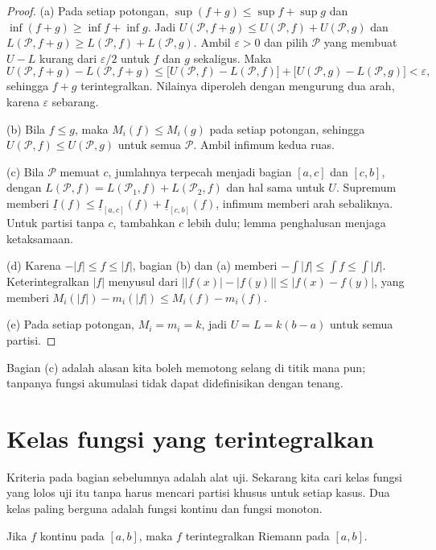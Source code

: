 \begin{proof}
(a) Pada setiap potongan, $\sup(f+g)\le\sup f+\sup g$ dan $\inf(f+g)\ge\inf f+\inf g$.
Jadi $U(\mathcal{P},f+g)\le U(\mathcal{P},f)+U(\mathcal{P},g)$ dan
$L(\mathcal{P},f+g)\ge L(\mathcal{P},f)+L(\mathcal{P},g)$. Ambil $\varepsilon>0$ dan
pilih $\mathcal{P}$ yang membuat $U-L$ kurang dari $\varepsilon/2$ untuk $f$ dan $g$
sekaligus. Maka
\[
U(\mathcal{P},f+g)-L(\mathcal{P},f+g)
\le\bigl[U(\mathcal{P},f)-L(\mathcal{P},f)\bigr]
+\bigl[U(\mathcal{P},g)-L(\mathcal{P},g)\bigr]<\varepsilon ,
\]
sehingga $f+g$ terintegralkan. Nilainya diperoleh dengan mengurung dua arah, karena
$\varepsilon$ sebarang.

(b) Bila $f\le g$, maka $M_i(f)\le M_i(g)$ pada setiap potongan, sehingga
$U(\mathcal{P},f)\le U(\mathcal{P},g)$ untuk semua $\mathcal{P}$. Ambil infimum kedua
ruas.

(c) Bila $\mathcal{P}$ memuat $c$, jumlahnya terpecah menjadi bagian $[a,c]$ dan
$[c,b]$, dengan $L(\mathcal{P},f)=L(\mathcal{P}_1,f)+L(\mathcal{P}_2,f)$ dan hal sama
untuk $U$. Supremum memberi
$\underline{I}(f)\le\underline{I}_{[a,c]}(f)+\underline{I}_{[c,b]}(f)$, infimum
memberi arah sebaliknya. Untuk partisi tanpa $c$, tambahkan $c$ lebih dulu; lemma
penghalusan menjaga ketaksamaan.

(d) Karena $-|f|\le f\le|f|$, bagian (b) dan (a) memberi
$-\int|f|\le\int f\le\int|f|$. Keterintegralkan $|f|$ menyusul dari
$\bigl||f(x)|-|f(y)|\bigr|\le|f(x)-f(y)|$, yang memberi
$M_i(|f|)-m_i(|f|)\le M_i(f)-m_i(f)$.

(e) Pada setiap potongan, $M_i=m_i=k$, jadi $U=L=k(b-a)$ untuk semua partisi.
\end{proof}

Bagian (c) adalah alasan kita boleh memotong selang di titik mana pun; tanpanya fungsi
akumulasi tidak dapat didefinisikan dengan tenang.

\section{Kelas fungsi yang terintegralkan}

Kriteria pada bagian sebelumnya adalah alat uji. Sekarang kita cari kelas fungsi yang
lolos uji itu tanpa harus mencari partisi khusus untuk setiap kasus. Dua kelas paling
berguna adalah fungsi kontinu dan fungsi monoton.

\begin{akibat}
Jika $f$ kontinu pada $[a,b]$, maka $f$ terintegralkan Riemann pada $[a,b]$.
\end{akibat}

